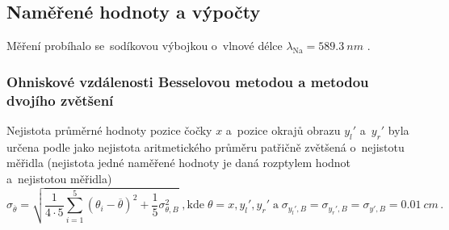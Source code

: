 \documentclass{../concepts/titul_zprava_p/prepareprotokolZprava} %
\begin{document}
\subsection{Naměřené hodnoty a výpočty}

Měření probíhalo se~sodíkovou výbojkou o~vlnové délce $\lambda_\mathrm{Na} = \qty{589.3}{nm}$ \cite{vlnovedelky}.

\subsubsection{Ohniskové vzdálenosti Besselovou metodou a metodou dvojího zvětšení}

Nejistota průměrné hodnoty pozice čočky $x$ a~pozice okrajů obrazu $y_l'$ a~$y_r'$ byla určena podle \cite{englich} jako 
nejistota aritmetického průměru patřičně zvětšená o~nejistotu měřidla (nejistota jedné naměřené hodnoty je daná
rozptylem hodnot a~nejistotou měřidla)
\begin{equation}
    \label{eq:sigma_mean_x_yl_yr}
    \sigma_{\overline{\theta}} = \sqrt{ \frac{1}{4 \cdot 5} \sum_{i=1}^{5} \left( \theta_i - \overline{\theta} \right)^2 +
    \frac{1}{5} \sigma_{\theta,B}^2 } \; \mathrm{, kde } \; \theta = x, y_l', y_r' \;\mathrm{ a }\; 
    \sigma_{y_l',B}=\sigma_{y_r',B} = \sigma_{y',B} = \qty{0.01}{cm}\,.
\end{equation}
\end{document}
